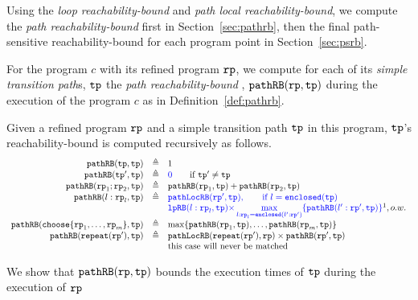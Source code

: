 Using the \emph{loop reachability-bound} and \emph{path local reachability-bound}, we compute the \emph{path reachability-bound} first in Section~\ref{sec:pathrb}, 
then the final path-sensitive reachability-bound for each program point in Section~\ref{sec:psrb}.

For the program $c$ with its refined program $\mathtt{rp}$, we compute
for each of its \emph{simple transition path}s, $\mathtt{tp}$ the \emph{path reachability-bound} , $\mathtt{pathRB}(\mathtt{rp}, \mathtt{tp})$ during the execution of the program $c$ as in Definition~\ref{def:pathrb}.
%
\begin{defn}
  \label{def:pathrb}
  Given a refined program $\mathtt{rp}$ and a simple transition path $\mathtt{tp}$ in this program, 
  $\mathtt{tp}$'s reachability-bound
  is computed recursively as follows. 
\[
  \begin{array}{rcl}
    \inoutB(\tpath, \tpath) & \triangleq & 1  \\
    \inoutB(\tpath', \tpath) & \triangleq & \highlight{0} \qquad \text{if } \tpath' \neq \tpath\\
    \inoutB(\rprog_1;\rprog_2, \tpath) & \triangleq & \inoutB(\rprog_1, \tpath) + \inoutB(\rprog_2, \tpath) \\
    \inoutB(l: \rprog_l, \tpath) & \triangleq & 
    \highlight{\outinB(\rprog', \tpath), \qquad \text{if } l = \kw{enclosed}(\tpath)}
    \\
    &  & 
    \highlight{
      \lpchB(l:\rprog_l, \tpath ) }
    \highlight{\times \max\limits_{l:\rprog_l = \kw{enclosed}(l':\rprog')}
   \{\inoutB(l':\rprog', \tpath)\} } \footnotemark, o.w. \\
    \inoutB(\rpchoose{\rprog_1, \ldots, \rprog_m }, \tpath) & \triangleq 
    & \max\left\{ \inoutB(\rprog_1, \tpath), \ldots, \inoutB(\rprog_m, \tpath) \right\} 
    \\
    \inoutB(\rprepeat(\rprog'), \tpath) & \triangleq & \outinB(\rprepeat(\rprog'), \rprog) \times \inoutB(\rprog', \tpath)\\
    &  & \text{this case will never be matched}
    \end{array}
  \]
  \end{defn}
%
We show that $\mathtt{pathRB}(\mathtt{rp}, \mathtt{tp})$ bounds the execution times of $\mathtt{tp}$ during the execution of $\mathtt{rp}$

